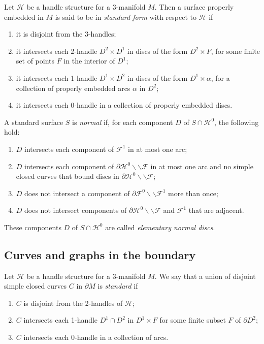 \documentclass[oneside]{amsart}
\numberwithin{equation}{section}
\theoremstyle{plain}
\theoremstyle{definition}
\newcommand{\cut}{\backslash\backslash}
\begin{document}
Let $\mathcal{H}$ be a handle structure for a 3-manifold $M$. Then a surface properly embedded
in $M$ is said to be in \emph{standard form} with respect to $\mathcal{H}$ if
\begin{enumerate}
\item it is disjoint from the 3-handles;
\item it intersects each 2-handle $D^2 \times D^1$ in discs of the form $D^2 \times F$, 
for some finite set of points $F$ in the interior of $D^1$;
\item it intersects each 1-handle $D^1 \times D^2$ in discs of the form $D^1 \times \alpha$,
for a collection of properly embedded arcs $\alpha$ in $D^2$;
\item it intersects each 0-handle in a collection of properly embedded discs.
\end{enumerate}

A standard surface $S$ is \emph{normal} if, for each component $D$ of $S \cap \mathcal{H}^0$,
the following hold:
\begin{enumerate}
\item $D$ intersects each component of $\mathcal{F}^1$ in at most one arc;
\item $D$ intersects each component of $\partial \mathcal{H}^0 \cut \mathcal{F}$ in at
most one arc and no simple closed curves that bound discs in $\partial \mathcal{H}^0 \cut \mathcal{F}$;
\item $D$ does not intersect a component of $\partial \mathcal{F}^0 \cut \mathcal{F}^1$
more than once;
\item $D$ does not intersect components of 
$\partial \mathcal{H}^0 \cut \mathcal{F}$ and
$\mathcal{F}^1$ 
that are adjacent.
\end{enumerate}

These components $D$ of $S \cap \mathcal{H}^0$ are called \emph{elementary normal discs}.

\subsection{Curves and graphs in the boundary}

Let $\mathcal{H}$ be a handle structure for a 3-manifold $M$. We say that a union of disjoint simple closed curves $C$ in $\partial M$ is
\emph{standard} if 
\begin{enumerate}
\item $C$ is disjoint from the 2-handles of $\mathcal{H}$;
\item $C$ intersects each 1-handle $D^1 \cap D^2$ in $D^1 \times F$
for some finite subset $F$ of $\partial D^2$;
\item $C$ intersects each 0-handle in a collection of arcs.
\end{enumerate}
\end{document}
